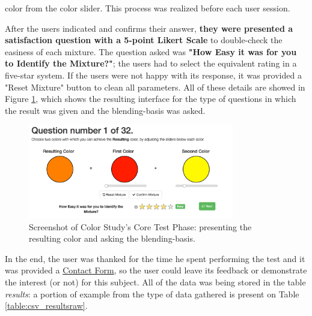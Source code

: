 color from the color slider. This process was realized before each user session. \par
%
After the users indicated and confirms their answer, \textbf{they were presented a satisfaction question with a 5-point Likert Scale} to double-check the easiness
of each mixture. The question asked was \textbf{"How Easy it was for you to Identify the Mixture?"}; the users had to select the equivalent rating in a
five-star system. If the users were not happy with its response, it was provided a "Reset Mixture" button to clean all parameters. All of these details are
showed in Figure \ref{fig:screen_core}, which shows the resulting interface for the type of questions in which the result was given and the blending-basis
was asked. \par
%
\begin{figure}[htbp]
	\centering
  \includegraphics[width=0.8\textwidth]{images/implementation/screen_core.png}
  \caption[Screenshot of Color Study's Core Test Phase: present the result and ask the blending-basis.]{Screenshot of
	Color Study's Core Test Phase: presenting the resulting color and asking the blending-basis.}
  \label{fig:screen_core}
\end{figure} \par
%
In the end, the user was thanked for the time he spent performing the test and it was provided a \ul{Contact Form}, so the user could leave its feedback or
demonstrate the interest (or not) for this subject. All of the data was being stored in the table \emph{results}: a portion of example from the type of data
gathered is present on Table \ref{table:csv_resultsraw}. \par
%

